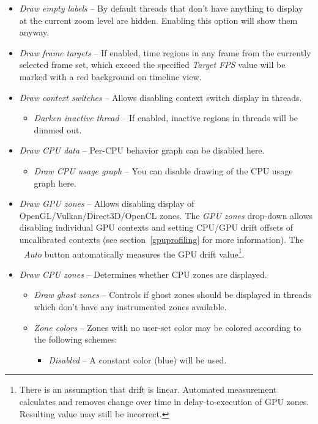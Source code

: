 \documentclass[hidelinks,titlepage,a4paper]{article}
\begin{document}
\begin{itemize}
\item \emph{\faExpand{} Draw empty labels} -- By default threads that don't have anything to display at the current zoom level are hidden. Enabling this option will show them anyway.
\item \emph{\faFlagCheckered{} Draw frame targets} -- If enabled, time regions in any frame from the currently selected frame set, which exceed the specified \emph{Target FPS} value will be marked with a red background on timeline view.
\item \emph{\faHiking{} Draw context switches} -- Allows disabling context switch display in threads.
\begin{itemize}
\item \emph{\faMoon{} Darken inactive thread} -- If enabled, inactive regions in threads will be dimmed out.
\end{itemize}
\item \emph{\faSlidersH{} Draw CPU data} -- Per-CPU behavior graph can be disabled here.
\begin{itemize}
\item \emph{\faSignature{} Draw CPU usage graph} -- You can disable drawing of the CPU usage graph here.
\end{itemize}
\item \emph{\faEye{} Draw GPU zones} -- Allows disabling display of OpenGL/Vulkan/Direct3D/OpenCL zones. The \emph{GPU zones} drop-down allows disabling individual GPU contexts and setting CPU/GPU drift offsets of uncalibrated contexts (see section~\ref{gpuprofiling} for more information). The \emph{\faRobot~Auto} button automatically measures the GPU drift value\footnote{There is an assumption that drift is linear. Automated measurement calculates and removes change over time in delay-to-execution of GPU zones. Resulting value may still be incorrect.}.
\item \emph{\faMicrochip{} Draw CPU zones} -- Determines whether CPU zones are displayed.
\begin{itemize}
\item \emph{\faGhost{} Draw ghost zones} -- Controls if ghost zones should be displayed in threads which don't have any instrumented zones available.
\item \emph{\faPalette{} Zone colors} -- Zones with no user-set color may be colored according to the following schemes:
\begin{itemize}
\item \emph{Disabled} -- A constant color (blue) will be used.

\end{itemize}
\end{itemize}
\end{itemize}
\end{document}

